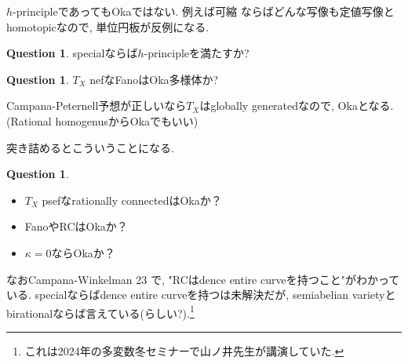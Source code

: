 \documentclass[dvipdfmx,a4paper,11pt]{article} %
\theoremstyle{definition}
\newtheorem{ques}[thm]{Question}
\theoremstyle{remark}
\numberwithin{equation}{section}
\begin{document}
$h$-principleであってもOkaではない. 
例えば可縮 ならばどんな写像も定値写像とhomotopicなので, 単位円板が反例になる. 

\begin{ques}
specialならば$h$-principleを満たすか? 
\end{ques}


\begin{ques}
$T_X$ nefなFanoはOka多様体か?
\end{ques}
Campana-Peternell予想が正しいなら$T_X$はglobally generatedなので, Okaとなる.
(Rational homogenusからOkaでもいい)

突き詰めるとこういうことになる.
\begin{ques}
\begin{itemize}
\item$T_X$ psefなrationally connectedはOkaか？
\item FanoやRCはOkaか？
\item $\kappa=0$ならOkaか？
\end{itemize}
\end{ques}




なおCampana-Winkelman 23 \cite{CW23}で, "RCはdence entire curveを持つこと"がわかっている. 
specialならばdence entire curveを持つは未解決だが, semiabelian varietyとbirationalならば言えている(らしい?).\footnote{これは2024年の多変数冬セミナーで山ノ井先生が講演していた.}






\end{document}
